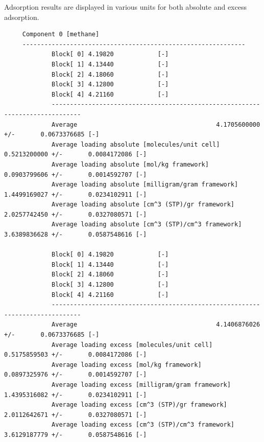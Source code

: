Adsorption results are displayed in various units for both absolute and excess adsorption.
\begin{tiny}
\begin{verbatim}
     Component 0 [methane]
     -------------------------------------------------------------
             Block[ 0] 4.19820            [-]
             Block[ 1] 4.13440            [-]
             Block[ 2] 4.18060            [-]
             Block[ 3] 4.12800            [-]
             Block[ 4] 4.21160            [-]
             ------------------------------------------------------------------------------
             Average                                      4.1705600000 +/-       0.0673376685 [-]
             Average loading absolute [molecules/unit cell]        0.5213200000 +/-       0.0084172086 [-]
             Average loading absolute [mol/kg framework]          0.0903799606 +/-       0.0014592707 [-]
             Average loading absolute [milligram/gram framework]          1.4499169027 +/-       0.0234102911 [-]
             Average loading absolute [cm^3 (STP)/gr framework]          2.0257742450 +/-       0.0327080571 [-]
             Average loading absolute [cm^3 (STP)/cm^3 framework]          3.6389836628 +/-       0.0587548616 [-]
     
             Block[ 0] 4.19820            [-]
             Block[ 1] 4.13440            [-]
             Block[ 2] 4.18060            [-]
             Block[ 3] 4.12800            [-]
             Block[ 4] 4.21160            [-]
             ------------------------------------------------------------------------------
             Average                                      4.1406876026 +/-       0.0673376685 [-]
             Average loading excess [molecules/unit cell]        0.5175859503 +/-       0.0084172086 [-]
             Average loading excess [mol/kg framework]          0.0897325976 +/-       0.0014592707 [-]
             Average loading excess [milligram/gram framework]          1.4395316082 +/-       0.0234102911 [-]
             Average loading excess [cm^3 (STP)/gr framework]          2.0112642671 +/-       0.0327080571 [-]
             Average loading excess [cm^3 (STP)/cm^3 framework]          3.6129187779 +/-       0.0587548616 [-]
\end{verbatim}
\end{tiny}

